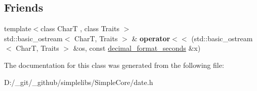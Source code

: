 \subsection*{Friends}
\begin{DoxyCompactItemize}
\item 
\mbox{\label{classdate_1_1detail_1_1decimal__format__seconds_3_01_duration_00_010_01_4_afec5c6bb3e79700c56a3b8d9a6c525a5}} 
{\footnotesize template$<$class CharT , class Traits $>$ }\\std\+::basic\+\_\+ostream$<$ CharT, Traits $>$ \& {\bfseries operator$<$$<$} (std\+::basic\+\_\+ostream$<$ CharT, Traits $>$ \&os, const \mbox{\hyperlink{classdate_1_1detail_1_1decimal__format__seconds}{decimal\+\_\+format\+\_\+seconds}} \&x)
\end{DoxyCompactItemize}


The documentation for this class was generated from the following file\+:\begin{DoxyCompactItemize}
\item 
D\+:/\+\_\+git/\+\_\+github/simplelibs/\+Simple\+Core/date.\+h\end{DoxyCompactItemize}
